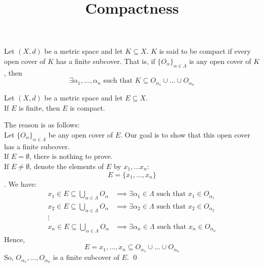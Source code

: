 \documentclass[a4paper]{article}
\date{}
\title{\flushleft \textbf{Compactness}}
\begin{document}
	\maketitle
	
	\begin{definition}[Compact]
		Let $(X,d)$ be a metric space and let $K \subseteq X$. $K$ is said to be compact if every open cover of $K$ has a finite subcover. That is, if $\{O_\alpha\}_{\alpha \in \Lambda}$ is any open cover of $K$, then
		$$\exists \alpha_1, ..., \alpha_n \text{ such that } K \subseteq O_{\alpha_1} \cup ... \cup O_{\alpha_n} $$
	\end{definition}
	
	\begin{example}
		Let $(X,d)$ be a metric space and let $E \subseteq X$. \\
		If $E$ is finite, then $E$ is compact.
	\end{example}
	The reason is as follows:\\
	Let $\{O_\alpha\}_{\alpha \in \Lambda}$ be any open cover of $E$. Our goal is to show that this open cover has a finite subcover. \\
	If $E= \emptyset$, there is nothing to prove. \\
	If $E \not = \emptyset$, denote the elements of $E$ by $x_1,...x_n:$ $$E=\{x_1,...,x_n\}$$.
	We have:
	\begin{align*}
		x_1 \in E \subseteq \bigcup \limits_{\alpha \in \Lambda} O_\alpha &\implies \exists \alpha_1 \in \Lambda \text { such that } x_1 \in O_{\alpha_1} \\
		x_2 \in E \subseteq \bigcup \limits_{\alpha \in \Lambda} O_\alpha &\implies \exists \alpha_2\in \Lambda \text { such that } x_2 \in O_{\alpha_2} \\
		\vdots \\
		x_n \in E \subseteq \bigcup \limits_{\alpha \in \Lambda} O_\alpha &\implies \exists \alpha_n\in \Lambda \text { such that } x_n \in O_{\alpha_n} 
	\end{align*}
	Hence,
	$$E = {x_1, ..., x_n} \subseteq O_{\alpha_1} \cup ... \cup O_{\alpha_n}$$
	So, $O_{\alpha_1},...,O_{\alpha_n}$ is a finite subcover of $E$. \qed \\
	
\end{document}
